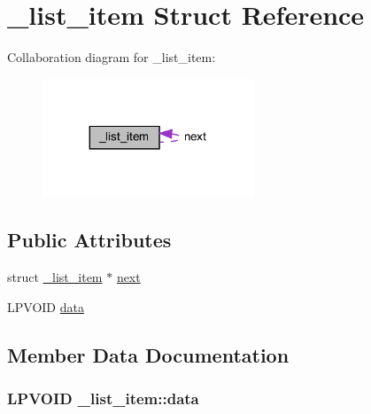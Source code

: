 \hypertarget{struct__list__item}{}\section{\+\_\+list\+\_\+item Struct Reference}
\label{struct__list__item}


Collaboration diagram for \+\_\+list\+\_\+item\+:
\nopagebreak
\begin{figure}[H]
\begin{center}
\leavevmode
\includegraphics[width=179pt]{struct__list__item__coll__graph}
\end{center}
\end{figure}
\subsection*{Public Attributes}
\begin{DoxyCompactItemize}
\item 
struct \hyperlink{struct__list__item}{\+\_\+list\+\_\+item} $\ast$ \hyperlink{struct__list__item_a981935f42bb92000481bdf9ddbefa16e}{next}
\item 
L\+P\+V\+O\+I\+D \hyperlink{struct__list__item_a979c6b62f85427984085df610dc04937}{data}
\end{DoxyCompactItemize}


\subsection{Member Data Documentation}
\hypertarget{struct__list__item_a979c6b62f85427984085df610dc04937}{}
\subsubsection[{data}]{\setlength{\rightskip}{0pt plus 5cm}L\+P\+V\+O\+I\+D \+\_\+list\+\_\+item\+::data}\label{struct__list__item_a979c6b62f85427984085df610dc04937}
\hypertarget{struct__list__item_a981935f42bb92000481bdf9ddbefa16e}{}
